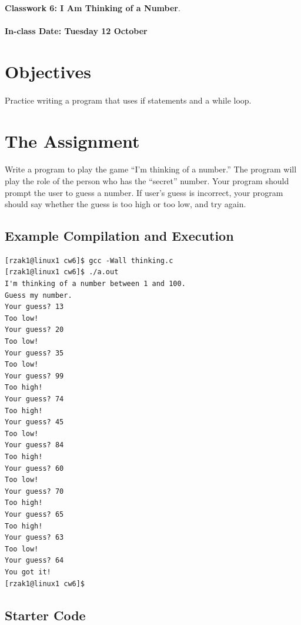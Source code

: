\documentclass[letter,11pt]{article}
\begin{document}
\huge
\textbf{Classwork 6: I Am Thinking of a Number}.
\normalsize
\\ ~~ \\
\textbf{In-class Date: Tuesday 12 October}

\section*{Objectives}
\paragraph{}Practice writing a program that uses if statements and a while loop.

\section*{The Assignment}
\paragraph{}Write a program to play the game ``I'm thinking of a number.'' The program will play the role of the person who has the ``secret'' number. Your program should prompt the user to guess a number. If user's guess is incorrect, your program should say whether the guess is too high or too low, and try again.

\subsection*{Example Compilation and Execution}
\begin{verbatim}
[rzak1@linux1 cw6]$ gcc -Wall thinking.c
[rzak1@linux1 cw6]$ ./a.out
I'm thinking of a number between 1 and 100.
Guess my number.
Your guess? 13
Too low!
Your guess? 20
Too low!
Your guess? 35
Too low!
Your guess? 99
Too high!
Your guess? 74
Too high!
Your guess? 45
Too low!
Your guess? 84
Too high!
Your guess? 60
Too low!
Your guess? 70
Too high!
Your guess? 65
Too high!
Your guess? 63
Too low!
Your guess? 64
You got it!
[rzak1@linux1 cw6]$ 
\end{verbatim}

\subsection*{Starter Code}
\end{document}
